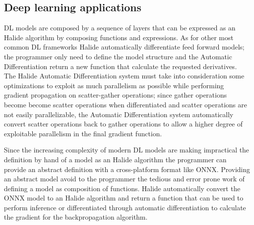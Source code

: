 \documentclass[../main.tex]{subfiles}
\begin{document}
\subsection{Deep learning applications}
DL models are composed by a sequence of layers that can be expressed as an Halide algorithm by composing functions and expressions. As for other most common DL frameworks Halide automatically differentiate feed forward models; the programmer only need to define the model structure and the Automatic Differentiation return a new function that calculate the requested derivatives.
The Halide Automatic Differentiation \cite{halideDifferentiable} system must take into consideration some optimizations to exploit as much parallelism as possible while performing gradient propagation on scatter-gather operations; since gather operations become become scatter operations  when differentiated and scatter operations are not easily parallelizable, the Automatic Differentiation system automatically convert scatter operations back to gather operations to allow a higher degree of exploitable parallelism in the final gradient function.

Since the increasing complexity of modern DL models are making impractical the definition by hand of a model as an Halide algorithm the programmer can provide an abstract definition with a cross-platform format like ONNX. Providing an abstract model avoid to the programmer the tedious and error prone work of defining a model as composition of functions. Halide automatically convert the ONNX model to an Halide algorithm and return a function that can be used to perform inference or differentiated through automatic differentiation to calculate the gradient for the backpropagation algorithm.
\end{document}

